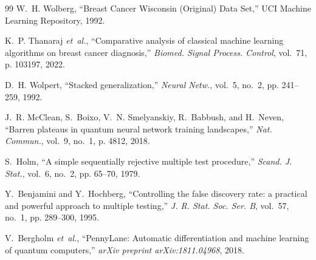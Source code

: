 \documentclass[journal,twocolumn]{IEEEtran}
\begin{document}
\begin{thebibliography}{99}
W.~H. Wolberg, ``Breast Cancer Wisconsin (Original) Data Set,'' UCI Machine Learning Repository, 1992.

K.~P. Thanaraj \emph{et~al.}, ``Comparative analysis of classical machine learning algorithms on breast cancer diagnosis,'' \emph{Biomed. Signal Process. Control}, vol.~71, p. 103197, 2022.

D.~H. Wolpert, ``Stacked generalization,'' \emph{Neural Netw.}, vol.~5, no.~2, pp. 241--259, 1992.

J.~R. McClean, S.~Boixo, V.~N. Smelyanskiy, R.~Babbush, and H.~Neven, ``Barren plateaus in quantum neural network training landscapes,'' \emph{Nat. Commun.}, vol.~9, no.~1, p. 4812, 2018.

S.~Holm, ``A simple sequentially rejective multiple test procedure,'' \emph{Scand. J. Stat.}, vol.~6, no.~2, pp. 65--70, 1979.

Y.~Benjamini and Y.~Hochberg, ``Controlling the false discovery rate: a practical and powerful approach to multiple testing,'' \emph{J. R. Stat. Soc. Ser. B}, vol.~57, no.~1, pp. 289--300, 1995.

V.~Bergholm \emph{et~al.}, ``PennyLane: Automatic differentiation and machine learning of quantum computers,'' \emph{arXiv preprint arXiv:1811.04968}, 2018.

\end{thebibliography}
\end{document}
